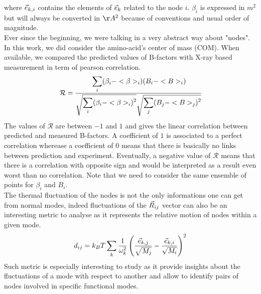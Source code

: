 where $\vec{e}_{k, i}$ contains the elements of $\vec{e}_k$ related to the node $i$. $\beta_i$ is expressed in $m^2$ but will always be converted in $\AA^2$ because of conventions and usual order of magnitude.\\
\noindent Ever since the beginning, we were talking in a very abstract way about "nodes". In this work, we did consider the amino-acid's center of mass (COM). When available, we compared the predicted values of B-factors with X-ray based measurement in term of pearson correlation.
\begin{equation}
	\label{pearsonr}
	\mathcal{R} = \cfrac{\displaystyle\sum_i (\beta_i - <\beta>_i)(B_i - <B>_i)}{\sqrt{\displaystyle\sum_i(\beta_i - <\beta>_i)^2}\sqrt{\displaystyle\sum_j(B_j - <B>_j)^2}}
\end{equation}
The values of $\mathcal{R}$ are between $-1$ and $1$ and gives the linear correlation between predicted and measured B-factors. A coefficient of $1$ is associated to a perfect correlation wherease a coefficient of $0$ means that there is basically no links between prediction and experiment. Eventually, a negative value of $\mathcal{R}$ means that there is a correlation with opposite sign and would be interpreted as a result even worst than no correlation. Note that we need to consider the same ensemble of points for $\beta_i$ and $B_i$.\\
\noindent The thermal fluctuation of the nodes is not the only informations one can get from normal modes, indeed fluctuations of the $\vec{R}_{ij}$ vector can also be an interesting metric to analyse as it represents the relative motion of nodes within a given mode. 
\begin{equation}
	\label{metric dij}
	d_{ij} = k_BT\sum_k \frac{1}{\omega_k^2}\left( \frac{\vec{e}_{k, j}}{\sqrt{M_j}} - \frac{\vec{e}_{k, i}}{\sqrt{M_i}} \right)^2
\end{equation}
Such metric is especially interesting to study as it provide insights about the fluctuations of a mode with respect to another and allow to identify pairs of nodes involved in specific functional modes.
